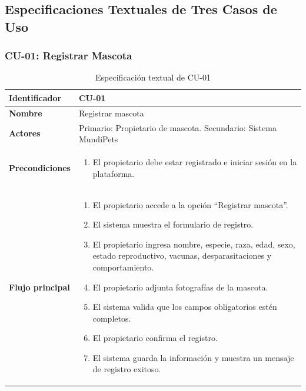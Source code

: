 \documentclass[journal,onecolumn]{IEEEtran}
\begin{document}
\subsection{Especificaciones Textuales de Tres Casos de Uso}

\subsubsection{CU-01: Registrar Mascota}

\begin{table}[H]
\caption{Especificación textual de CU-01}
\label{tab:cu01}
\begin{tabularx}{\textwidth}{|l|X|}
\hline
\textbf{Identificador}       & CU-01 \\
\hline
\textbf{Nombre}              & Registrar mascota \\
\hline
\textbf{Actores}             & Primario: Propietario de mascota. Secundario: Sistema MundiPets \\
\hline
\textbf{Precondiciones}      & \begin{enumerate}[leftmargin=*,topsep=0pt]
                                 \item El propietario debe estar registrado e iniciar sesión en la plataforma.
                               \end{enumerate} \\
\hline
\textbf{Flujo principal}     & \begin{enumerate}[leftmargin=*,topsep=0pt]
                                 \item El propietario accede a la opción ``Registrar mascota''.
                                 \item El sistema muestra el formulario de registro.
                                 \item El propietario ingresa nombre, especie, raza, edad, sexo, estado reproductivo, vacunas, desparasitaciones y comportamiento.
                                 \item El propietario adjunta fotografías de la mascota.
                                 \item El sistema valida que los campos obligatorios estén completos.
                                 \item El propietario confirma el registro.
                                 \item El sistema guarda la información y muestra un mensaje de registro exitoso.

\end{enumerate}
\end{tabularx}
\end{table}
\end{document}
